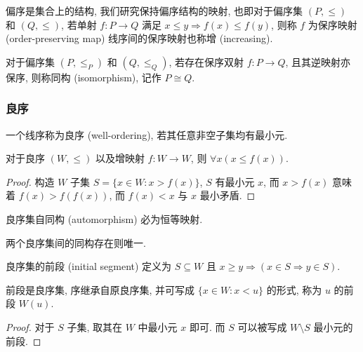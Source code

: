 \begin{definition}
    偏序是集合上的结构, 我们研究保持偏序结构的映射, 也即对于偏序集 \((P, \le)\) 和 \((Q, \le)\),
    若单射 \(f : P \to Q\) 满足 \(x \le y \Rightarrow f(x) \le f(y)\), 则称 \(f\) 为保序映射 (order-preserving map)
    线序间的保序映射也称增 (increasing).
\end{definition}

\begin{definition}
    对于偏序集 \((P, \le_P)\) 和 \((Q, \le_Q)\), 若存在保序双射 \(f : P \to Q\), 且其逆映射亦保序, 则称同构 (isomorphism), 记作 \(P \cong Q\).
\end{definition}

\subsubsection{良序}

\begin{definition}
    一个线序称为良序 (well-ordering), 若其任意非空子集均有最小元.
\end{definition}

\begin{lemma}
    \label{lemma:well-ordering increasing map lemma}
    对于良序 \((W, \le)\) 以及增映射 \(f : W \to W\), 则 \(\forall x (x \le f(x))\).

    \begin{proof}
        构造 \(W\) 子集 \(S = \{x \in W : x > f(x)\}\), \(S\) 有最小元 \(x\),
        而 \(x > f(x)\) 意味着 \(f(x) > f(f(x))\), 而 \(f(x) < x\) 与 \(x\) 最小矛盾.
    \end{proof}
\end{lemma}

\begin{corollary}
    良序集自同构 (automorphism) 必为恒等映射.
\end{corollary}

\begin{corollary}
    两个良序集间的同构存在则唯一.
\end{corollary}

\begin{definition}
    良序集的前段 (initial segment) 定义为 \(S \subseteq W\) 且 \(x \ge y \Rightarrow (x \in S \Rightarrow y \in S)\).
\end{definition}

\begin{lemma}
    \label{lemma:well-ordering segment is well-ordering lemma}
    前段是良序集, 序继承自原良序集, 并可写成 \(\{x \in W : x < u\}\) 的形式, 称为 \(u\) 的前段 \(W(u)\).

    \begin{proof}
        对于 \(S\) 子集, 取其在 \(W\) 中最小元 \(x\) 即可. 而 \(S\) 可以被写成 \(W \setminus S\) 最小元的前段.
    \end{proof}
\end{lemma}

